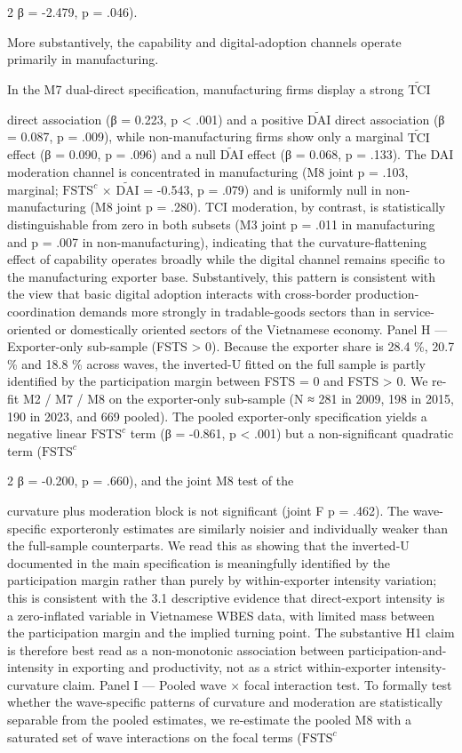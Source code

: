\documentclass[12pt,a4paper]{article}
\begin{document}
2 β = -2.479, p = .046).

More substantively, the capability and digital-adoption channels operate
primarily in manufacturing.

In the M7 dual-direct specification, manufacturing firms display a
strong \(\tilde{\mathrm{TCI}}\)

direct association (β = 0.223, p \textless{} .001) and a positive
\(\tilde{\mathrm{DAI}}\) direct association (β = 0.087, p = .009), while
non-manufacturing firms show only a marginal \(\tilde{\mathrm{TCI}}\)
effect (β = 0.090, p = .096) and a null \(\tilde{\mathrm{DAI}}\) effect
(β = 0.068, p = .133). The DAI moderation channel is concentrated in
manufacturing (M8 joint p = .103, marginal; \(\mathrm{FSTS}^{c}\) ×
\(\tilde{\mathrm{DAI}}\) = -0.543, p = .079) and is uniformly null in
non-manufacturing (M8 joint p = .280). TCI moderation, by contrast, is
statistically distinguishable from zero in both subsets (M3 joint p =
.011 in manufacturing and p = .007 in non-manufacturing), indicating
that the curvature-flattening effect of capability operates broadly
while the digital channel remains specific to the manufacturing exporter
base. Substantively, this pattern is consistent with the view that basic
digital adoption interacts with cross-border production-coordination
demands more strongly in tradable-goods sectors than in service-oriented
or domestically oriented sectors of the Vietnamese economy. Panel H ---
Exporter-only sub-sample (FSTS \textgreater{} 0). Because the exporter
share is 28.4 \%, 20.7 \% and 18.8 \% across waves, the inverted-U
fitted on the full sample is partly identified by the participation
margin between FSTS = 0 and FSTS \textgreater{} 0. We re-fit M2 / M7 /
M8 on the exporter-only sub-sample (N ≈ 281 in 2009, 198 in 2015, 190 in
2023, and 669 pooled). The pooled exporter-only specification yields a
negative linear \(\mathrm{FSTS}^{c}\) term (β = -0.861, p \textless{}
.001) but a non-significant quadratic term (\(\mathrm{FSTS}^{c}\)

2 β = -0.200, p = .660), and the joint M8 test of the

curvature plus moderation block is not significant (joint F p = .462).
The wave-specific exporteronly estimates are similarly noisier and
individually weaker than the full-sample counterparts. We read this as
showing that the inverted-U documented in the main specification is
meaningfully identified by the participation margin rather than purely
by within-exporter intensity variation; this is consistent with the 3.1
descriptive evidence that direct-export intensity is a zero-inflated
variable in Vietnamese WBES data, with limited mass between the
participation margin and the implied turning point. The substantive H1
claim is therefore best read as a non-monotonic association between
participation-and-intensity in exporting and productivity, not as a
strict within-exporter intensity-curvature claim. Panel I --- Pooled
wave × focal interaction test. To formally test whether the
wave-specific patterns of curvature and moderation are statistically
separable from the pooled estimates, we re-estimate the pooled M8 with a
saturated set of wave interactions on the focal terms
(\(\mathrm{FSTS}^{c}\)
\end{document}
